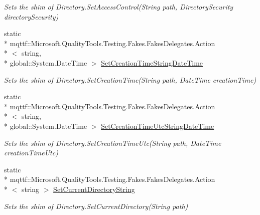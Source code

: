 \begin{DoxyCompactItemize}
\begin{DoxyCompactList}\small\item\em Sets the shim of Directory.\-Set\-Access\-Control(\-String path, Directory\-Security directory\-Security)\end{DoxyCompactList}\item 
static \\*
mqttf\-::\-Microsoft.\-Quality\-Tools.\-Testing.\-Fakes.\-Fakes\-Delegates.\-Action\\*
$<$ string, \\*
global\-::\-System.\-Date\-Time $>$ \hyperlink{class_system_1_1_i_o_1_1_fakes_1_1_shim_directory_a32355f10aefeb9ab164ac4693a0b9294}{Set\-Creation\-Time\-String\-Date\-Time}
\begin{DoxyCompactList}\small\item\em Sets the shim of Directory.\-Set\-Creation\-Time(\-String path, Date\-Time creation\-Time)\end{DoxyCompactList}\item 
static \\*
mqttf\-::\-Microsoft.\-Quality\-Tools.\-Testing.\-Fakes.\-Fakes\-Delegates.\-Action\\*
$<$ string, \\*
global\-::\-System.\-Date\-Time $>$ \hyperlink{class_system_1_1_i_o_1_1_fakes_1_1_shim_directory_abf212e0627e8f027af59ca4d1cf7f540}{Set\-Creation\-Time\-Utc\-String\-Date\-Time}
\begin{DoxyCompactList}\small\item\em Sets the shim of Directory.\-Set\-Creation\-Time\-Utc(\-String path, Date\-Time creation\-Time\-Utc)\end{DoxyCompactList}\item 
static \\*
mqttf\-::\-Microsoft.\-Quality\-Tools.\-Testing.\-Fakes.\-Fakes\-Delegates.\-Action\\*
$<$ string $>$ \hyperlink{class_system_1_1_i_o_1_1_fakes_1_1_shim_directory_a584e6497450e9912b12f64e0a7bc229a}{Set\-Current\-Directory\-String}
\begin{DoxyCompactList}\small\item\em Sets the shim of Directory.\-Set\-Current\-Directory(\-String path)\end{DoxyCompactList}\item 

\end{DoxyCompactItemize}
